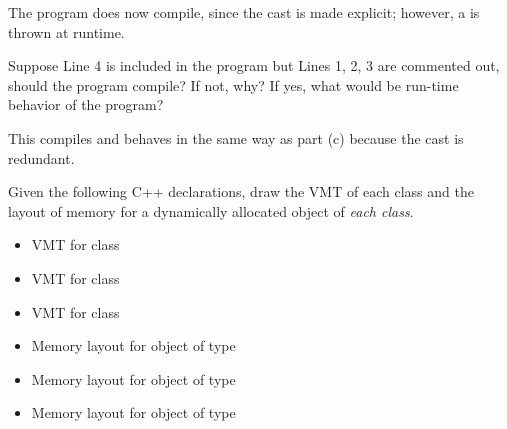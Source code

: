 \documentclass[12pt,letterpaper]{hmcpset}
\begin{document}
\begin{solution}
The program does now compile, since the cast is made explicit; however, a  is thrown at runtime.
\end{solution}

\begin{problem}[5e]
Suppose Line 4 is included in the program but Lines 1, 2, 3 are commented out, should the program compile? If not, why? If yes, what would be run-time behavior of the program?
\end{problem}

\begin{solution}
This compiles and behaves in the same way as part (c) because the cast is redundant.
\end{solution}

\begin{problem}[6]
Given the following C++ declarations, draw the VMT of each class and the layout of memory for a dynamically allocated object of \emph{each class}. 
\end{problem}

\begin{solution}
\begin{itemize}
\item VMT for class 

\item VMT for class 

\item VMT for class 


\item Memory layout for object of type 

\item Memory layout for object of type 

\item Memory layout for object of type 

\end{itemize}
\end{solution}
\end{document}
